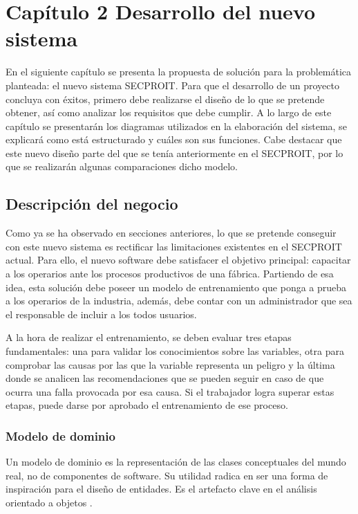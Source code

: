 \chapter*{Capítulo 2 \vspace{0.5cm} \break Desarrollo del nuevo sistema}
\setcounter{chapter}{2}
\setcounter{section}{0}

En el siguiente capítulo se presenta la propuesta de solución para la problemática planteada: el nuevo sistema SECPROIT. Para que el desarrollo de un proyecto concluya con éxitos, primero debe realizarse el diseño de lo que se pretende obtener, así como analizar los requisitos que debe cumplir. A lo largo de este capítulo se presentarán los diagramas utilizados en la elaboración del sistema, se explicará como está estructurado y cuáles son sus funciones. Cabe destacar que este nuevo diseño parte del que se tenía anteriormente en el SECPROIT, por lo que se realizarán algunas comparaciones dicho modelo.

\section{Descripción del negocio}
Como ya se ha observado en secciones anteriores, lo que se pretende conseguir con este nuevo sistema es rectificar las limitaciones existentes en el SECPROIT actual. Para ello, el nuevo software debe satisfacer el objetivo principal: capacitar a los operarios ante los procesos productivos de una fábrica.
Partiendo de esa idea, esta solución debe poseer un modelo de entrenamiento que ponga a prueba a los operarios de la industria, además, debe contar con un administrador que sea el responsable de incluir a los todos usuarios.

A la hora de realizar el entrenamiento, se deben evaluar tres etapas fundamentales: una para validar los conocimientos sobre las variables, otra para comprobar las causas por las que la variable representa un peligro y la última donde se analicen las recomendaciones que se pueden seguir en caso de que ocurra una falla provocada por esa causa. Si el trabajador logra superar estas etapas, puede darse por aprobado el entrenamiento de ese proceso.

\subsection{Modelo de dominio}
Un modelo de dominio es la representación de las clases conceptuales del mundo real, no de componentes de software. Su utilidad radica en ser una forma de inspiración para el diseño de entidades. Es el artefacto clave en el análisis orientado a objetos \cite{Herchi2012}.

